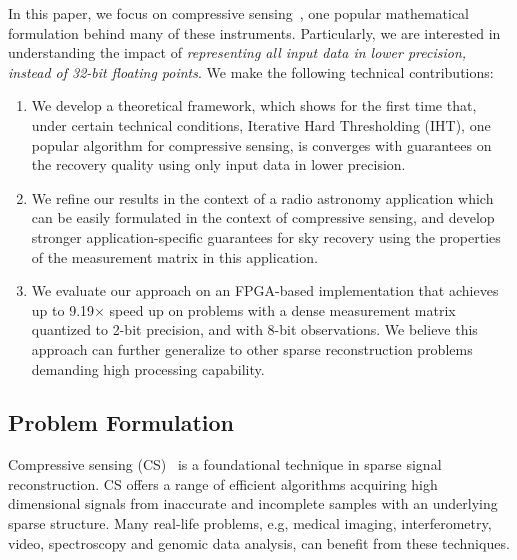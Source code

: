 \documentclass{article}
\begin{document}
In this paper, we focus on compressive sensing~\cite{donoho2006cs, candes2006cs, candes2006cs2}, one popular mathematical formulation behind many of these instruments. Particularly, we are interested in understanding
the impact of {\em representing all input data
in lower precision, instead of 32-bit floating points}. 
We make the following technical contributions:

\vspace{-1em}
\begin{enumerate}
\item We develop a theoretical framework, which shows for the first time that, under certain
technical conditions, Iterative Hard Thresholding (IHT),
one popular algorithm for compressive sensing, is converges
with guarantees on the recovery quality using only 
input data in lower precision.
\item We refine our results in the context of a radio
astronomy application which can be easily formulated in
the context of compressive sensing, 
and develop {stronger} application-specific 
guarantees for sky recovery using the properties of the measurement matrix in this application. 
\item We evaluate our approach on an FPGA-based
implementation that achieves up to 9.19$\times$ speed up 
on problems with a dense measurement matrix quantized to 2-bit precision, and with 8-bit observations.
We believe this approach can further generalize to other sparse reconstruction problems demanding high processing capability. 
\end{enumerate}




\vspace{-1em}
\subsection{Problem Formulation}
\vspace{-0.5em}
Compressive sensing (CS)~\cite{donoho2006cs, candes2006cs, candes2006cs2} is a foundational technique in sparse signal reconstruction. CS offers a range of efficient algorithms acquiring high dimensional signals from inaccurate and incomplete samples with an underlying sparse structure. 
Many real-life problems, e.g, medical imaging, interferometry, video, spectroscopy and genomic data analysis, can benefit from these techniques.
\end{document}
